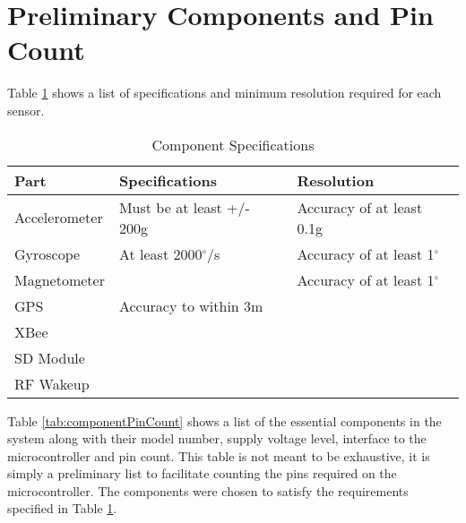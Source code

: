 \section{Preliminary Components and Pin Count}

Table \ref{tab:sensorResolution} shows a list of specifications and minimum resolution required for each sensor.

\begin{table}[htbp]
  \centering
  \caption{Component Specifications}
    \begin{tabular}{|m{1in}|m{2.2in}|m{2.2in}|}
    \hline
     Part  &  Specifications &  Resolution \\
    \hline \hline
    Accelerometer & Must be at least +/- 200g & Accuracy of at least 0.1g \\ \hline
    Gyroscope & At least 2000$^{\circ}$/s & Accuracy of at least 1$^{\circ}$ \\ \hline
    Magnetometer & & Accuracy of at least 1$^{\circ}$ \\ \hline
    GPS   & Accuracy to within 3m &  \\ \hline 
    XBee  & & \\ \hline
    SD Module & & \\ \hline
    RF Wakeup & & \\ \hline
    
    \end{tabular}%
  \label{tab:sensorResolution}%
\end{table}%

Table \ref{tab:componentPinCount} shows a list of the essential components in the system along with their model number, supply voltage level, interface to the microcontroller and pin count.  This table is not meant to be exhaustive, it is simply a preliminary list to facilitate counting the pins required on the microcontroller. The components were chosen to satisfy the requirements specified in Table \ref{tab:sensorResolution}.

